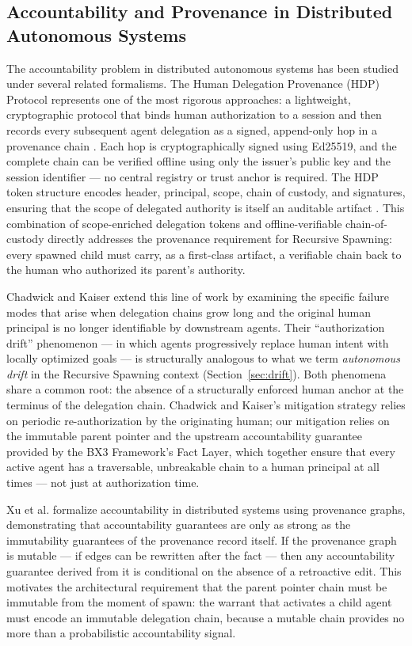 \subsection{Accountability and Provenance in Distributed Autonomous Systems}

The accountability problem in distributed autonomous systems has been studied under several related formalisms. The Human Delegation Provenance (HDP) Protocol represents one of the most rigorous approaches: a lightweight, cryptographic protocol that binds human authorization to a session and then records every subsequent agent delegation as a signed, append-only hop in a provenance chain \cite{hdp2026,hdp2025ietf}. Each hop is cryptographically signed using Ed25519, and the complete chain can be verified offline using only the issuer's public key and the session identifier — no central registry or trust anchor is required. The HDP token structure encodes header, principal, scope, chain of custody, and signatures, ensuring that the scope of delegated authority is itself an auditable artifact \cite{hdp2026}. This combination of scope-enriched delegation tokens and offline-verifiable chain-of-custody directly addresses the provenance requirement for Recursive Spawning: every spawned child must carry, as a first-class artifact, a verifiable chain back to the human who authorized its parent's authority.

Chadwick and Kaiser \cite{chadwick2023} extend this line of work by examining the specific failure modes that arise when delegation chains grow long and the original human principal is no longer identifiable by downstream agents. Their ``authorization drift'' phenomenon — in which agents progressively replace human intent with locally optimized goals — is structurally analogous to what we term \emph{autonomous drift} in the Recursive Spawning context (Section~\ref{sec:drift}). Both phenomena share a common root: the absence of a structurally enforced human anchor at the terminus of the delegation chain. Chadwick and Kaiser's mitigation strategy relies on periodic re-authorization by the originating human; our mitigation relies on the immutable parent pointer and the upstream accountability guarantee provided by the BX3 Framework's Fact Layer, which together ensure that every active agent has a traversable, unbreakable chain to a human principal at all times — not just at authorization time.

Xu et al. \cite{xu2023} formalize accountability in distributed systems using provenance graphs, demonstrating that accountability guarantees are only as strong as the immutability guarantees of the provenance record itself. If the provenance graph is mutable — if edges can be rewritten after the fact — then any accountability guarantee derived from it is conditional on the absence of a retroactive edit. This motivates the architectural requirement that the parent pointer chain must be immutable from the moment of spawn: the warrant that activates a child agent must encode an immutable delegation chain, because a mutable chain provides no more than a probabilistic accountability signal.

